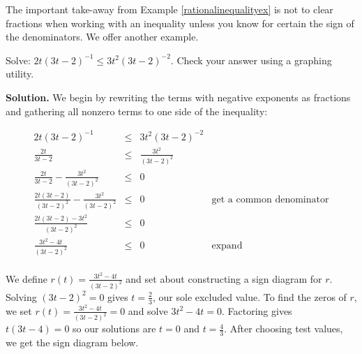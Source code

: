 \documentclass{ximera}
\begin{document}
The important take-away from Example \ref{rationalinequalityex} is not to clear fractions when working with an inequality unless you know for certain the sign of the denominators. We offer another example.

\begin{example} \label{morerationalineq} Solve:  $2t (3t-2)^{-1} \leq 3t^2 (3t-2)^{-2}$. Check your answer using a graphing utility.


{\bf Solution.} We begin by rewriting the terms with negative exponents as fractions and gathering all nonzero terms to one side of the inequality:

\[ \begin{array}{rclr}

2t (3t-2)^{-1} &  \leq & 3t^2 (3t-2)^{-2} & \\  

 \frac{2t}{3t-2} & \leq &  \frac{3t^2}{(3t-2)^2} & \\  


 \frac{2t}{3t-2}  -  \frac{3t^2}{(3t-2)^2}  & \leq & 0 &  \\  

 \frac{2t(3t-2)}{(3t-2)^2}  -  \frac{3t^2}{(3t-2)^2}  & \leq & 0  & \text{get a common denominator} \\  

 \frac{2t(3t-2) - 3t^2}{(3t-2)^2}  & \leq & 0  &\\  

 \frac{3t^2-4t}{(3t-2)^2}  & \leq & 0  & \text{expand} \\  

\end{array} \]

We define $r(t) = \frac{3t^2-4t}{(3t-2)^2}$ and set about constructing a sign diagram for $r$.  Solving  $(3t-2)^2 = 0$ gives $t = \frac{2}{3}$, our sole excluded value.  To find the zeros of $r$, we set $r(t) = \frac{3t^2-4t}{(3t-2)^2} = 0$ and solve $3t^2-4t = 0$.  Factoring gives $t(3t-4) = 0$ so our solutions are $t = 0$ and $t = \frac{4}{3}$. After choosing test values, we  get the sign diagram below.   

\begin{image}
\end{image}


\end{example}
\end{document}
